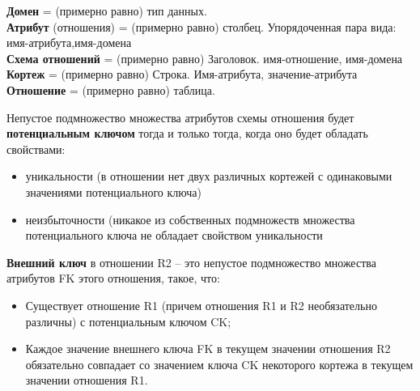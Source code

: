 \textbf{Домен} = (примерно равно) тип данных.\\
\textbf{Атрибут} (отношения) = (примерно равно) столбец. Упорядоченная пара вида:\\
имя-атрибута,имя-домена\\
\textbf{Схема отношений} = (примерно равно) Заголовок. имя-отношение, имя-домена\\
\textbf{Кортеж} = (примерно равно) Строка. Имя-атрибута, значение-атрибута
\textbf{Отношение} = (примерно равно) таблица.

Непустое подмножество множества атрибутов схемы отношения будет \textbf{потенциальным ключом} тогда и только тогда,
когда оно будет обладать свойствами:
\begin{itemize}
	\item уникальности (в отношении нет двух различных кортежей с одинаковыми
	      значениями потенциального ключа)
	\item неизбыточности (никакое из собственных подмножеств множества
	      потенциального ключа не обладает свойством уникальности
\end{itemize}

\textbf{Внешний ключ} в отношении R2 – это непустое подмножество множества атрибутов FK этого отношения, такое, что:
\begin{itemize}
	\item Существует отношение R1 (причем отношения R1 и R2 необязательно различны) с потенциальным ключом CK;
	\item Каждое значение внешнего ключа FK в текущем значении отношения R2 обязательно совпадает со значением ключа CK
	      некоторого кортежа в текущем значении отношения R1.
\end{itemize}


